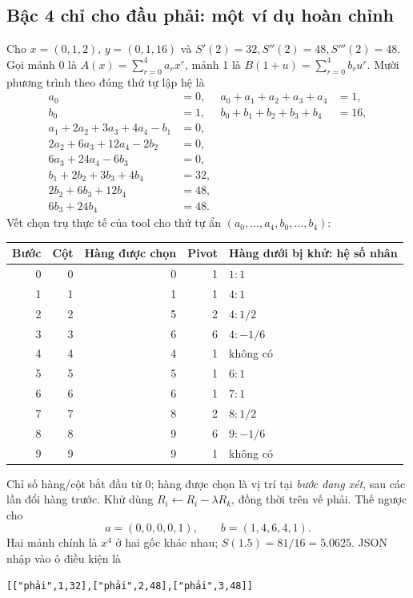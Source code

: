 \subsection{Bậc 4 chỉ cho đầu phải: một ví dụ hoàn chỉnh}
\label{sec:spline-quartic-right}
Cho $x=(0,1,2)$, $y=(0,1,16)$ và
$S'(2)=32,S''(2)=48,S'''(2)=48$.
Gọi mảnh 0 là $A(x)=\sum_{r=0}^4a_rx^r$, mảnh 1 là $B(1+u)=\sum_{r=0}^4b_ru^r$.
Mười phương trình theo đúng thứ tự lập hệ là
\begin{align*}
a_0&=0,&a_0+a_1+a_2+a_3+a_4&=1,\\
b_0&=1,&b_0+b_1+b_2+b_3+b_4&=16,\\
a_1+2a_2+3a_3+4a_4-b_1&=0,\\
2a_2+6a_3+12a_4-2b_2&=0,\\
6a_3+24a_4-6b_3&=0,\\
b_1+2b_2+3b_3+4b_4&=32,\\
2b_2+6b_3+12b_4&=48,\\
6b_3+24b_4&=48.
\end{align*}
Vết chọn trụ thực tế của tool cho thứ tự ẩn $(a_0,\ldots,a_4,b_0,\ldots,b_4)$:
\begin{center}\small
\begin{tabular}{rrrrl}
\toprule
Bước & Cột & Hàng được chọn & Pivot & Hàng dưới bị khử: hệ số nhân\\ \midrule
0&0&0&1&$1:1$\\
1&1&1&1&$4:1$\\
2&2&5&2&$4:1/2$\\
3&3&6&6&$4:-1/6$\\
4&4&4&1&không có\\
5&5&5&1&$6:1$\\
6&6&6&1&$7:1$\\
7&7&8&2&$8:1/2$\\
8&8&9&6&$9:-1/6$\\
9&9&9&1&không có\\ \bottomrule
\end{tabular}\end{center}
Chỉ số hàng/cột bắt đầu từ 0; hàng được chọn là vị trí tại \emph{bước đang xét}, sau các lần đổi hàng trước.
Khử dùng $R_i\leftarrow R_i-\lambda R_k$, đồng thời trên vế phải.
Thế ngược cho
\[
a=(0,0,0,0,1),\qquad b=(1,4,6,4,1).
\]
Hai mảnh chính là $x^4$ ở hai gốc khác nhau; $S(1.5)=81/16=5.0625$.
JSON nhập vào ô điều kiện là
\begin{verbatim}
[["phải",1,32],["phải",2,48],["phải",3,48]]
\end{verbatim}

